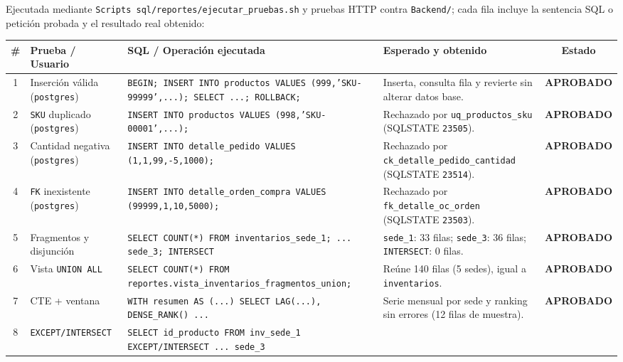 \documentclass[11pt,oneside]{article}
\newcommand{\okbadge}{\textcolor{ok}{\sffamily\bfseries APROBADO}}
\begin{document}
Ejecutada mediante \texttt{Scripts sql/reportes/ejecutar\_pruebas.sh} y pruebas
HTTP contra \texttt{Backend/}; cada fila incluye la sentencia SQL o petici\'on
probada y el resultado real obtenido:

\begin{center}
\renewcommand{\arraystretch}{1.22}
{\scriptsize
\begin{tabularx}{\linewidth}{@{} c >{\raggedright\arraybackslash}p{2.25cm} >{\ttfamily\raggedright\arraybackslash\hyphenpenalty=10000\exhyphenpenalty=10000}p{4.95cm} >{\raggedright\arraybackslash}X c @{}}
\toprule
\rowcolor{fondo}
{\sffamily\bfseries \#} & {\sffamily\bfseries Prueba / Usuario} & {\sffamily\bfseries SQL / Operaci\'on ejecutada} & {\sffamily\bfseries Esperado y obtenido} & {\sffamily\bfseries Estado} \\
\midrule
1 & Inserci\'on v\'alida (\texttt{postgres}) &
  \texttt{BEGIN; INSERT INTO productos VALUES (999,'SKU-99999',...); SELECT ...; ROLLBACK;} &
  Inserta, consulta fila y revierte sin alterar datos base. & \okbadge \\
2 & \texttt{SKU} duplicado (\texttt{postgres}) &
  \texttt{INSERT INTO productos VALUES (998,'SKU-00001',...);} &
  Rechazado por \texttt{uq\_productos\_sku} (SQLSTATE \texttt{23505}). & \okbadge \\
3 & Cantidad negativa (\texttt{postgres}) &
  \texttt{INSERT INTO detalle\_pedido VALUES (1,1,99,-5,1000);} &
  Rechazado por \texttt{ck\_detalle\_pedido\_cantidad} (SQLSTATE \texttt{23514}). & \okbadge \\
4 & \texttt{FK} inexistente (\texttt{postgres}) &
  \texttt{INSERT INTO detalle\_orden\_compra VALUES (99999,1,10,5000);} &
  Rechazado por \texttt{fk\_detalle\_oc\_orden} (SQLSTATE \texttt{23503}). & \okbadge \\
5 & Fragmentos y disjun\-ci\'on &
  \texttt{SELECT COUNT(*) FROM inventarios\_sede\_1; ... sede\_3; INTERSECT} &
  \texttt{sede\_1}: 33 filas; \texttt{sede\_3}: 36 filas; \texttt{INTERSECT}: 0 filas. & \okbadge \\
6 & Vista \texttt{UNION ALL} &
  \texttt{SELECT COUNT(*) FROM reportes.\allowbreak vista\_inventarios\_\allowbreak fragmentos\_union;} &
  Re\'une 140 filas (5 sedes), igual a \texttt{inventarios}. & \okbadge \\
7 & CTE + ventana &
  \texttt{WITH resumen AS (...) SELECT LAG(...), DENSE\_RANK() ...} &
  Serie mensual por sede y ranking sin errores (12 filas de muestra). & \okbadge \\
8 & \texttt{EXCEPT/INTERSECT} &
  \texttt{SELECT id\_producto FROM inv\_sede\_1 EXCEPT/INTERSECT ... sede\_3} &

\end{tabularx}}
\end{center}
\end{document}
